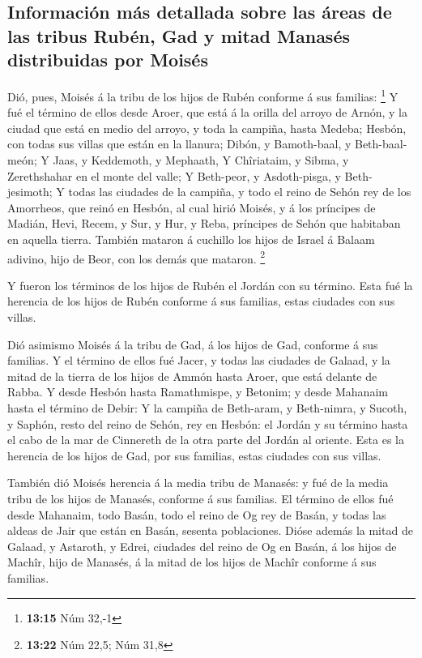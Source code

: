 \hypertarget{informaciuxf3n-muxe1s-detallada-sobre-las-uxe1reas-de-las-tribus-rubuxe9n-gad-y-mitad-manasuxe9s-distribuidas-por-moisuxe9s}{%
\subsection{Información más detallada sobre las áreas de las tribus
Rubén, Gad y mitad Manasés distribuidas por
Moisés}\label{informaciuxf3n-muxe1s-detallada-sobre-las-uxe1reas-de-las-tribus-rubuxe9n-gad-y-mitad-manasuxe9s-distribuidas-por-moisuxe9s}}

 Dió, pues, Moisés á la tribu de los hijos de Rubén
conforme á sus familias: \footnote{\textbf{13:15} Núm 32,-1}
 Y fué el término de ellos desde Aroer, que está á la
orilla del arroyo de Arnón, y la ciudad que está en medio del arroyo, y
toda la campiña, hasta Medeba;  Hesbón, con todas sus
villas que están en la llanura; Dibón, y Bamoth-baal, y Beth-baal-meón;
 Y Jaas, y Keddemoth, y Mephaath,  Y
Chîriataim, y Sibma, y Zerethshahar en el monte del valle; 
Y Beth-peor, y Asdoth-pisga, y Beth-jesimoth;  Y todas las
ciudades de la campiña, y todo el reino de Sehón rey de los Amorrheos,
que reinó en Hesbón, al cual hirió Moisés, y á los príncipes de Madián,
Hevi, Recem, y Sur, y Hur, y Reba, príncipes de Sehón que habitaban en
aquella tierra.  También mataron á cuchillo los hijos de
Israel á Balaam adivino, hijo de Beor, con los demás que mataron.
\footnote{\textbf{13:22} Núm 22,5; Núm 31,8}

 Y fueron los términos de los hijos de Rubén el Jordán con
su término. Esta fué la herencia de los hijos de Rubén conforme á sus
familias, estas ciudades con sus villas.

 Dió asimismo Moisés á la tribu de Gad, á los hijos de Gad,
conforme á sus familias.  Y el término de ellos fué Jacer,
y todas las ciudades de Galaad, y la mitad de la tierra de los hijos de
Ammón hasta Aroer, que está delante de Rabba.  Y desde
Hesbón hasta Ramathmispe, y Betonim; y desde Mahanaim hasta el término
de Debir:  Y la campiña de Beth-aram, y Beth-nimra, y
Sucoth, y Saphón, resto del reino de Sehón, rey en Hesbón: el Jordán y
su término hasta el cabo de la mar de Cinnereth de la otra parte del
Jordán al oriente.  Esta es la herencia de los hijos de
Gad, por sus familias, estas ciudades con sus villas.

 También dió Moisés herencia á la media tribu de Manasés: y
fué de la media tribu de los hijos de Manasés, conforme á sus familias.
 El término de ellos fué desde Mahanaim, todo Basán, todo
el reino de Og rey de Basán, y todas las aldeas de Jair que están en
Basán, sesenta poblaciones.  Dióse además la mitad de
Galaad, y Astaroth, y Edrei, ciudades del reino de Og en Basán, á los
hijos de Machîr, hijo de Manasés, á la mitad de los hijos de Machîr
conforme á sus familias.

